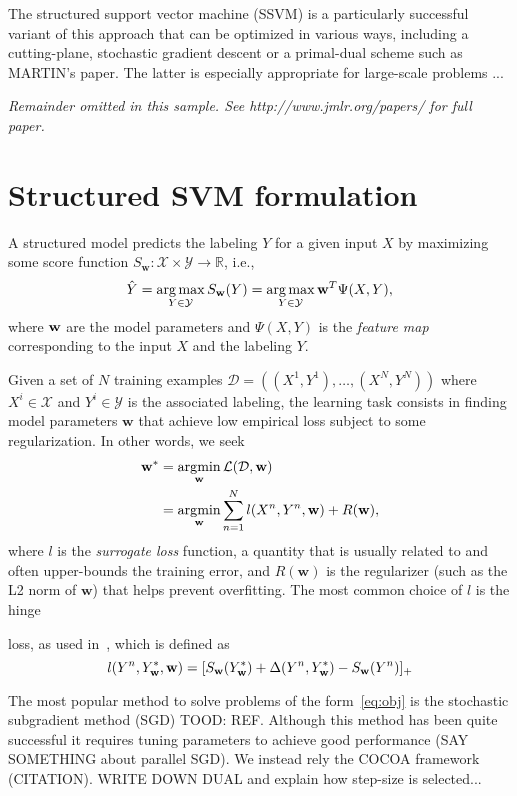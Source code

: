 \documentclass[twoside,11pt]{article}
\newcommand{\w}{{\bf w}}
\DeclareMathOperator*{\argmax}{arg\,max}
\DeclareMathOperator*{\argmin}{\arg\!\min} %
\begin{document}
The structured support vector machine (SSVM) is a particularly successful variant of this approach that can be optimized in various ways, including a cutting-plane, stochastic gradient descent or a primal-dual scheme such as MARTIN's paper. The latter is especially appropriate for large-scale problems ...

{\noindent \em Remainder omitted in this sample. See http://www.jmlr.org/papers/ for full paper.}

\section{Structured SVM formulation}

A structured model predicts the labeling $Y$ for a given input $X$ by maximizing some score function
$S_\mathbf{w}:\mathcal{X} \times \mathcal{Y} \rightarrow \mathbb{R}$,
i.e.,
%
\begin{equation}
\label{eq:inference}
\hat{Y} = \argmax_{Y \in \mathcal{Y}} S_\w(Y) = \argmax_{Y \in \mathcal{Y}} \w^T\Psi(X,Y),
\end{equation}
%
where $\w$ are the model parameters and $\Psi(X,Y)$ is the \emph{feature map} corresponding to the input $X$ and the labeling $Y$.


Given a set of $N$ training examples $\mathcal{D}=((X^1,Y^1), \dots, (X^N,Y^N))$ where $X^i \in \mathcal{X}$ and $Y^i \in \mathcal{Y}$ is the associated labeling, 
the learning task consists in finding model parameters $\mathbf{w}$ that
achieve low empirical loss subject to some regularization. In other words, we seek
%
\begin{align}
\label{eq:obj}
\nonumber
\w^* &= \argmin_\w \mathcal{L}(\mathcal{D}, \w) \\
& = \argmin_{\w} \sum_{n=1}^N l(X^n, Y^n, \w) + R(\w),
\end{align}
%
where $l$ is the \emph{surrogate loss} function,
a quantity that is usually related to and often upper-bounds the training error, 
and $R(\mathbf{w})$ is the regularizer (such as the L2 norm of $\mathbf{w}$)
that helps prevent overfitting. 
The most common choice of $l$ is the hinge

loss, as used in~\cite{Taskar:2003tt,Tsochantaridis:2005ww}, which is defined as
\begin{equation}
\label{eq:hinge-loss}
l(Y^n, Y^*_\mathbf{w}, \w) = [S_\mathbf{w}(Y^*_\w) + \Delta(Y^n,Y^*_\w) - S_\w(Y^n)]_+
\end{equation}


The most popular method to solve problems of the form~\ref{eq:obj} is the stochastic subgradient method (SGD) TOOD: REF. Although this method has been quite successful it requires tuning parameters to achieve good performance (SAY SOMETHING about parallel SGD). We instead rely the COCOA framework (CITATION). WRITE DOWN DUAL and explain how step-size is selected...
\end{document}
